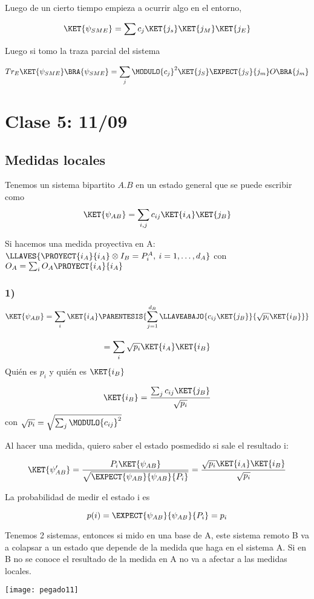Luego de un cierto tiempo empieza a ocurrir algo en el entorno,

\[
\KET{\psi_{SME}}=\sum c_{j}\KET{j_{s}}\KET{j_{M}}\KET{j_{E}}
\]

Luego si tomo la traza parcial del sistema

\[
Tr_{E}\KET{\psi_{SME}}\BRA{\psi_{SME}}=\sum_{j}\MODULO{c_{j}}^{2}\KET{j_{S}}\EXPECT{j_{S}}{j_{m}}O\BRA{j_{m}}
\]


\chapter{Clase 5: 11/09}

\section{Medidas locales}

Tenemos un sistema bipartito $A.B$ en un estado general que se puede
escribir como 
\[
\KET{\psi_{AB}}=\sum_{i,j}c_{ij}\KET{i_{A}}\KET{j_{B}}
\]

Si hacemos una medida proyectiva en A: $\LLAVES{\PROYECT{i_{A}}{i_{A}}\otimes I_{B}=P_{i}^{A},\:i=1,\dots,d_{A}}$
con $O_{A}=\sum_{i}O_{A}\PROYECT{i_{A}}{i_{A}}$

\subsection*{1) 
\[
\protect\KET{\psi_{AB}}=\sum_{i}\protect\KET{i_{A}}\protect\PARENTESIS{\sum_{j=1}^{d_{B}}\protect\LLAVEABAJO{c_{ij}\protect\KET{j_{B}}}{\sqrt{p_{i}}\protect\KET{i_{B}}}}
\]
}

\[
=\sum_{i}\sqrt{p_{i}}\KET{i_{A}}\KET{i_{B}}
\]
Quién es $p_{i}$ y quién es $\KET{i_{B}}$

\[
\KET{i_{B}}=\frac{\sum_{j}c_{ij}\KET{j_{B}}}{\sqrt{p_{i}}}
\]
con $\sqrt{p_{i}}=\sqrt{\sum_{j}\MODULO{c_{ij}}^{2}}$

Al hacer una medida, quiero saber el estado posmedido si sale el resultado
i:

\[
\KET{\psi'_{AB}}=\frac{P_{i}\KET{\psi_{AB}}}{\sqrt{\EXPECT{\psi_{AB}}{\psi_{AB}}{P_{i}}}}=\frac{\sqrt{p_{i}}\KET{i_{A}}\KET{i_{B}}}{\sqrt{p_{i}}}
\]

La probabilidad de medir el estado i es 

\[
p(i)=\EXPECT{\psi_{AB}}{\psi_{AB}}{P_{i}}=p_{i}
\]

Tenemos 2 sistemas, entonces si mido en una base de A, este sistema
remoto B va a colapsar a un estado que depende de la medida que haga
en el sistema A. Si en B no se conoce el resultado de la medida en
A no va a afectar a las medidas locales. 
\begin{center}
\texttt{[image: pegado11]}
\par\end{center}

